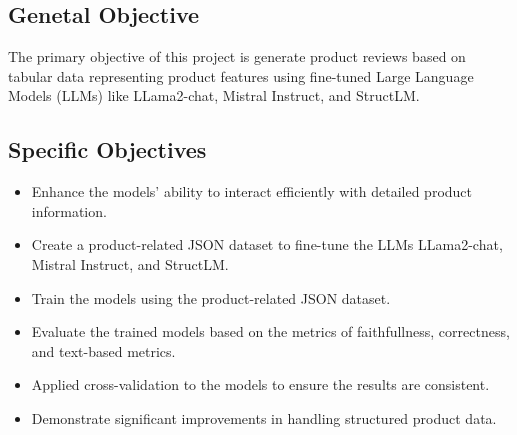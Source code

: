 \subsection{Genetal Objective}
The primary objective of this project is generate product reviews based on tabular data representing product features using fine-tuned Large Language Models (LLMs) like LLama2-chat, Mistral Instruct, and StructLM.
\subsection{Specific Objectives}
\begin{itemize}
    \item Enhance the models' ability to interact efficiently with detailed product information.
    \item Create a product-related JSON dataset to fine-tune the LLMs LLama2-chat, Mistral Instruct, and StructLM.
    \item Train the models using the product-related JSON dataset.
    \item Evaluate the trained models based on the metrics of faithfullness, correctness, and text-based metrics.
    \item Applied cross-validation to the models to ensure the results are consistent.
    \item Demonstrate significant improvements in handling structured product data.
\end{itemize}